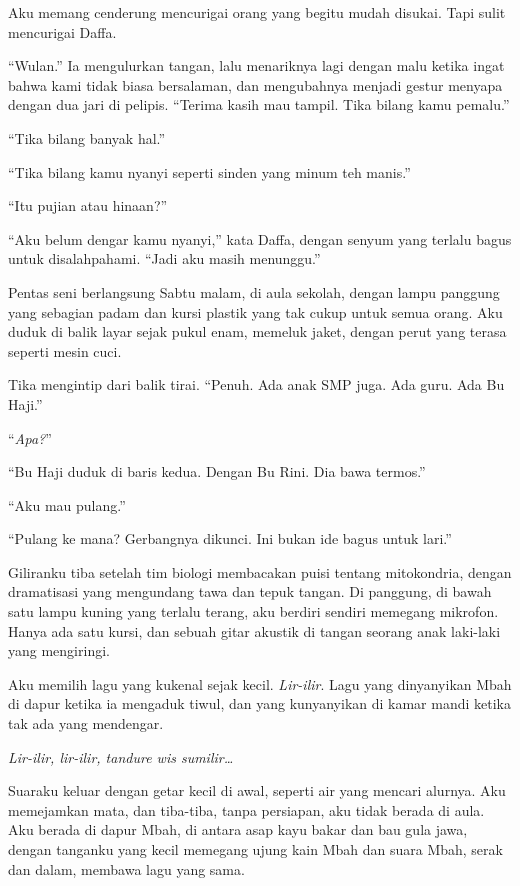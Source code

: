 \documentclass[11pt,twoside,openany]{book}
\makeatletter
\newcommand{\scenebreak}{\par\vspace{0.9em}{\centering\textsc{*\hspace{0.7em}*\hspace{0.7em}*}\par}\vspace{0.9em}\@afterindentfalse\@afterheading}
\makeatother
\begin{document}
Aku memang cenderung mencurigai orang yang begitu mudah disukai. Tapi sulit mencurigai Daffa.

``Wulan.'' Ia mengulurkan tangan, lalu menariknya lagi dengan malu ketika ingat bahwa kami tidak biasa bersalaman, dan mengubahnya menjadi gestur menyapa dengan dua jari di pelipis. ``Terima kasih mau tampil. Tika bilang kamu pemalu.''

``Tika bilang banyak hal.''

``Tika bilang kamu nyanyi seperti sinden yang minum teh manis.''

``Itu pujian atau hinaan?''

``Aku belum dengar kamu nyanyi,'' kata Daffa, dengan senyum yang terlalu bagus untuk disalahpahami. ``Jadi aku masih menunggu.''

\scenebreak
Pentas seni berlangsung Sabtu malam, di aula sekolah, dengan lampu panggung yang sebagian padam dan kursi plastik yang tak cukup untuk semua orang. Aku duduk di balik layar sejak pukul enam, memeluk jaket, dengan perut yang terasa seperti mesin cuci.

Tika mengintip dari balik tirai. ``Penuh. Ada anak SMP juga. Ada guru. Ada Bu Haji.''

``\emph{Apa?}''

``Bu Haji duduk di baris kedua. Dengan Bu Rini. Dia bawa termos.''

``Aku mau pulang.''

``Pulang ke mana? Gerbangnya dikunci. Ini bukan ide bagus untuk lari.''

Giliranku tiba setelah tim biologi membacakan puisi tentang mitokondria, dengan dramatisasi yang mengundang tawa dan tepuk tangan. Di panggung, di bawah satu lampu kuning yang terlalu terang, aku berdiri sendiri memegang mikrofon. Hanya ada satu kursi, dan sebuah gitar akustik di tangan seorang anak laki-laki yang mengiringi.

Aku memilih lagu yang kukenal sejak kecil. \emph{Lir-ilir}. Lagu yang dinyanyikan Mbah di dapur ketika ia mengaduk tiwul, dan yang kunyanyikan di kamar mandi ketika tak ada yang mendengar.

\emph{Lir-ilir, lir-ilir, tandure wis sumilir\ldots{}}

Suaraku keluar dengan getar kecil di awal, seperti air yang mencari alurnya. Aku memejamkan mata, dan tiba-tiba, tanpa persiapan, aku tidak berada di aula. Aku berada di dapur Mbah, di antara asap kayu bakar dan bau gula jawa, dengan tanganku yang kecil memegang ujung kain Mbah dan suara Mbah, serak dan dalam, membawa lagu yang sama.
\end{document}
